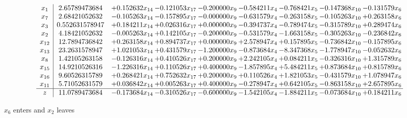 \documentclass[10pt]{article}
\begin{document}
 \[\begin{array}{c| c c@{\hskip 2pt} c@{\hskip 2pt} c@{\hskip 2pt} c@{\hskip 2pt} c@{\hskip 2pt} c@{\hskip 2pt} c@{\hskip 2pt} }
 x_{1}   &  2.65789473684 & + 0.152632 x_{14} & -0.121053 x_{17} & -0.200000 x_{9} & -0.584211 x_{4} & -0.768421 x_{5} & -0.147368 x_{10} & -0.131579 x_{6}\\
 x_{7}   &  2.68421052632 & -0.105263 x_{14} & -0.157895 x_{17} & -0.000000 x_{9} & -0.631579 x_{4} & -0.263158 x_{5} & -0.105263 x_{10} & + 0.263158 x_{6}\\
 x_{3}   &  0.552631578947 & + 0.184211 x_{14} & + 0.026316 x_{17} & + 0.000000 x_{9} & -0.394737 x_{4} & -0.789474 x_{5} & -0.315789 x_{10} & + 0.289474 x_{6}\\
 x_{2}   &  4.18421052632 & -0.005263 x_{14} & + 0.142105 x_{17} & -0.200000 x_{9} & -0.531579 x_{4} & -1.663158 x_{5} & -0.305263 x_{10} & -0.236842 x_{6}\\
 x_{12}   &  12.7894736842 & + 0.263158 x_{14} & + 0.894737 x_{17} & + 0.000000 x_{9} & + 2.578947 x_{4} & + 0.157895 x_{5} & -0.736842 x_{10} & -0.157895 x_{6}\\
 x_{13}   &  23.2631578947 & + 1.021053 x_{14} & + 0.431579 x_{17} & -1.200000 x_{9} & -0.873684 x_{4} & -8.347368 x_{5} & -1.778947 x_{10} & -0.052632 x_{6}\\
 x_{8}   &  1.42105263158 & -0.126316 x_{14} & + 0.410526 x_{17} & + 0.200000 x_{9} & + 2.242105 x_{4} & + 0.084211 x_{5} & -0.326316 x_{10} & + 1.315789 x_{6}\\
 x_{15}   &  14.9210526316 & -1.226316 x_{14} & + 0.110526 x_{17} & + 0.400000 x_{9} & -1.857895 x_{4} & + 5.484211 x_{5} & + 0.873684 x_{10} & + 0.815789 x_{6}\\
 x_{16}   &  9.60526315789 & + 0.268421 x_{14} & + 0.752632 x_{17} & + 0.200000 x_{9} & + 0.110526 x_{4} & + 1.821053 x_{5} & -0.431579 x_{10} & + 1.078947 x_{6}\\
 x_{11}   &  5.71052631579 & + 0.036842 x_{14} & + 0.005263 x_{17} & + 0.400000 x_{9} & -0.278947 x_{4} & + 0.642105 x_{5} & -0.863158 x_{10} & + 2.657895 x_{6}\\
\hline
z    &  11.0789473684 & -0.173684 x_{14} & -0.310526 x_{17} & -0.600000 x_{9} & -1.542105 x_{4} & -1.884211 x_{5} & -0.073684 x_{10} & + 0.184211 x_{6}\\
\end{array}\]


 $ x_{6} $ enters and $ x_{2} $ leaves 
\end{document}
